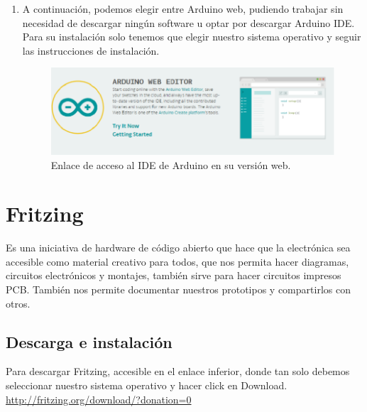 \begin{appendix}
\begin{enumerate}
\item A continuación, podemos elegir entre Arduino web, pudiendo trabajar sin necesidad de descargar ningún software u
optar por descargar Arduino IDE. Para su instalación solo tenemos que elegir nuestro sistema operativo y
seguir las instrucciones de instalación.

\begin{figure}[H]
  \begin{center}
    \includegraphics[scale=0.3]{imagenes/arduino_web_ide.png}
  \end{center}
  \label{fig:descarga_arduino}
 \caption{Enlace de acceso al IDE de Arduino en su versión web.}
 \end{figure}

\end{enumerate}

\section{Fritzing}

Es una iniciativa de hardware de código abierto que hace que la electrónica sea accesible como
material creativo para todos, que nos permita hacer diagramas, circuitos electrónicos y
montajes, también sirve para hacer circuitos impresos PCB. También nos permite documentar nuestros prototipos y compartirlos con otros.

\subsection{Descarga e instalación}

Para descargar Fritzing, accesible en el enlace inferior, donde tan solo debemos seleccionar nuestro sistema operativo y hacer click en Download. \\

\url{http://fritzing.org/download/?donation=0}


\end{appendix}
